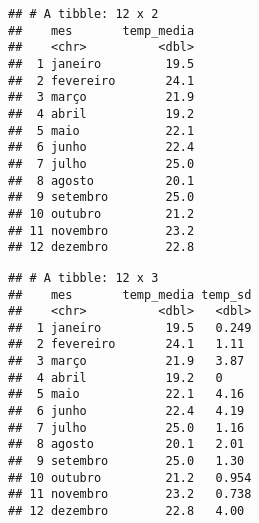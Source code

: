 \documentclass[]{book}
\newenvironment{Shaded}{\begin{snugshade}}{\end{snugshade}}
\newcommand{\DataTypeTok}[1]{\textcolor[rgb]{0.13,0.29,0.53}{#1}}
\newcommand{\KeywordTok}[1]{\textcolor[rgb]{0.13,0.29,0.53}{\textbf{#1}}}
\newcommand{\NormalTok}[1]{#1}
\newcommand{\OperatorTok}[1]{\textcolor[rgb]{0.81,0.36,0.00}{\textbf{#1}}}
\newcommand{\OtherTok}[1]{\textcolor[rgb]{0.56,0.35,0.01}{#1}}
\newcommand{\StringTok}[1]{\textcolor[rgb]{0.31,0.60,0.02}{#1}}
\begin{document}
\begin{verbatim}
## # A tibble: 12 x 2
##    mes       temp_media
##    <chr>          <dbl>
##  1 janeiro         19.5
##  2 fevereiro       24.1
##  3 março           21.9
##  4 abril           19.2
##  5 maio            22.1
##  6 junho           22.4
##  7 julho           25.0
##  8 agosto          20.1
##  9 setembro        25.0
## 10 outubro         21.2
## 11 novembro        23.2
## 12 dezembro        22.8
\end{verbatim}

\begin{Shaded}
\end{Shaded}

\begin{verbatim}
## # A tibble: 12 x 3
##    mes       temp_media temp_sd
##    <chr>          <dbl>   <dbl>
##  1 janeiro         19.5   0.249
##  2 fevereiro       24.1   1.11 
##  3 março           21.9   3.87 
##  4 abril           19.2   0    
##  5 maio            22.1   4.16 
##  6 junho           22.4   4.19 
##  7 julho           25.0   1.16 
##  8 agosto          20.1   2.01 
##  9 setembro        25.0   1.30 
## 10 outubro         21.2   0.954
## 11 novembro        23.2   0.738
## 12 dezembro        22.8   4.00
\end{verbatim}
\end{document}

